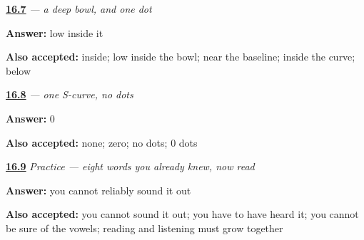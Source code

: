 \noindent\begin{minipage}[t]{\linewidth}
\raggedright
\hyperlink{review-UR-W16-nun-dot}{\textbf{16.7}} \emph{ — a deep bowl, and one dot}\par
\small \textbf{Answer:} low inside it\par
\footnotesize \textbf{Also accepted:} inside; low inside the bowl; near the baseline; inside the curve; below
\end{minipage}\par\medskip

\noindent\begin{minipage}[t]{\linewidth}
\raggedright
\hyperlink{review-UR-W16-ye-dots}{\textbf{16.8}} \emph{ — one S-curve, no dots}\par
\small \textbf{Answer:} 0\par
\footnotesize \textbf{Also accepted:} none; zero; no dots; 0 dots
\end{minipage}\par\medskip

\noindent\begin{minipage}[t]{\linewidth}
\raggedright
\hyperlink{review-UR-C16-practice-vowels}{\textbf{16.9}} \emph{Practice — eight words you already knew, now read}\par
\small \textbf{Answer:} you cannot reliably sound it out\par
\footnotesize \textbf{Also accepted:} you cannot sound it out; you have to have heard it; you cannot be sure of the vowels; reading and listening must grow together
\end{minipage}\par\medskip
